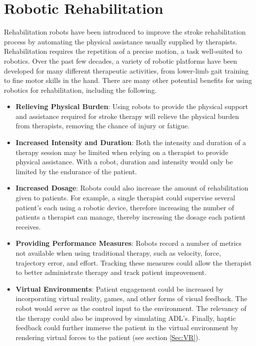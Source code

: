 \documentclass[12pt]{report}
\begin{document}
\section{Robotic Rehabilitation}

	Rehabilitation robots have been introduced to improve the stroke rehabilitation process by automating the physical assistance usually supplied by therapists. Rehabilitation requires the repetition of a precise motion, a task well-suited to robotics. Over the past few decades, a variety of robotic platforms have been developed for many different therapeutic activities, from lower-limb gait training to fine motor skills in the hand. There are many other potential benefits for using robotics for rehabilitation, including the following.
\begin{itemize}
	\item \textbf{Relieving Physical Burden}: Using robots to provide the physical support and assistance required for stroke therapy will relieve the physical burden from therapists, removing the chance of injury or fatigue.
	\item \textbf{Increased Intensity and Duration}: Both the intensity and duration of a therapy session may be limited when relying on a therapist to provide physical assistance. With a robot, duration and intensity would only be limited by the endurance of the patient. 
	\item \textbf{Increased Dosage}: Robots could also increase the amount of rehabilitation given to patients. For example, a single therapist could supervise several patient's each using a robotic device, therefore increasing the number of patients a therapist can manage, thereby increasing the dosage each patient receives.
	\item \textbf{Providing Performance Measures}: Robots record a number of metrics not available when using traditional therapy, such as velocity, force, trajectory error, and effort. Tracking these measures could allow the therapist to better administrate therapy and track patient improvement. 
	\item \textbf{Virtual Environments}: Patient engagement could be increased by incorporating virtual reality, games, and other forms of visual feedback. The robot would serve as the control input to the environment. The relevancy of the therapy could also be improved by simulating ADL's. Finally, haptic feedback could further immerse the patient in the virtual environment by rendering virtual forces to the patient (see section \ref{Sec:VR}).
\end{itemize}
	
\end{document}
